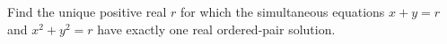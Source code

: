 Find the unique positive real $r$ for which the simultaneous equations $x+y=r$ and $x^2+y^2=r$ have exactly one real ordered-pair solution.
